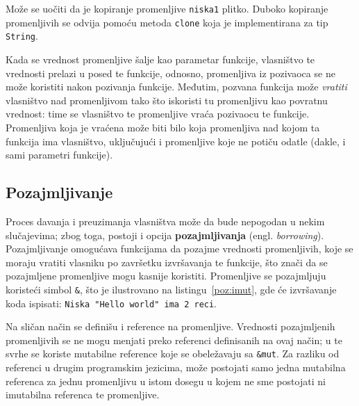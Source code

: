 \documentclass[12pt,oneside]{memoir}
\begin{document}


Može se uočiti da je kopiranje promenljive \texttt{niska1} plitko. Duboko kopiranje promenljivih
se odvija pomoću metoda \texttt{clone} koja je implementirana za tip \texttt{String}.


Kada se vrednost promenljive šalje kao parametar funkcije, vlasništvo te vrednosti prelazi
u posed te funkcije, odnosno, promenljiva iz pozivaoca se ne može koristiti nakon pozivanja funkcije.
Međutim, pozvana funkcija može \emph{vratiti} vlasništvo nad promenljivom tako što iskoristi tu
promenljivu kao povratnu vrednost: time se vlasništvo te promenljive vraća pozivaocu te funkcije.
Promenljiva koja je vraćena može biti bilo koja promenljiva nad kojom ta funkcija ima vlasništvo,
uključujući i promenljive koje ne potiču odatle (dakle, i sami parametri funkcije).

\subsection{Pozajmljivanje}\label{subsec:pozajmljivanje}
Proces davanja i preuzimanja vlasništva može da bude nepogodan u nekim slučajevima; zbog toga,
postoji i opcija \textbf{pozajmljivanja} (engl. \emph{borrowing}). Pozajmljivanje omogućava
funkcijama da pozajme vrednosti promenljivih, koje se moraju vratiti vlasniku po završetku
izvršavanja te funkcije, što znači da se pozajmljene promenljive mogu kasnije koristiti.
Promenljive se pozajmljuju koristeći simbol \texttt{\&}, što je ilustrovano na
listingu~\ref{poz:imut}, gde će izvršavanje koda ispisati: \texttt{Niska "Hello world"
ima 2 reci}.



Na sličan način se definišu i reference na promenljive. Vrednosti pozajmljenih promenljivih se ne
mogu menjati preko referenci definisanih na ovaj način; u te svrhe
se koriste mutabilne reference koje se obeležavaju sa \texttt{\&mut}. Za razliku od referenci
u drugim programskim jezicima, može postojati samo jedna mutabilna referenca za jednu
promenljivu u istom dosegu u kojem ne sme postojati ni imutabilna referenca te promenljive.
\end{document}
